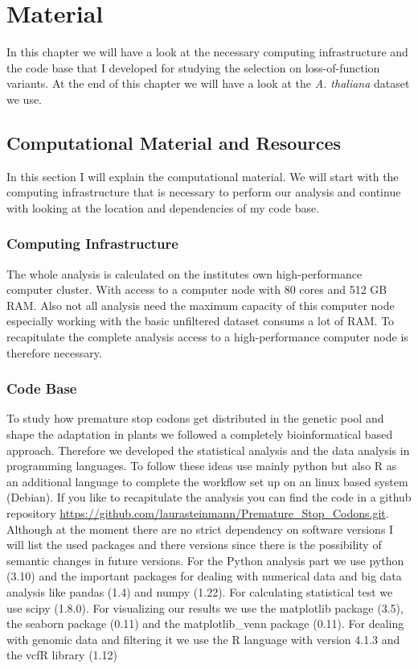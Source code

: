 \chapter{Material}
In this chapter we will have a look at the necessary computing infrastructure and the code base that I developed for studying the selection on loss-of-function variants. At the end of this chapter we will have a look at the \textit{A. thaliana} dataset we use.
\section{Computational Material and Resources}
In this section I will explain the computational material. We will start with the computing infrastructure that is necessary to perform our analysis and continue with looking at the location and dependencies of my code base.
\subsection{Computing Infrastructure}
The whole analysis is calculated on the institutes own high-performance computer cluster. With access to a computer node with 80 cores and 512 GB RAM. Also not all analysis need the maximum capacity of this computer node especially working with the basic unfiltered dataset consums a lot of RAM. To recapitulate the complete analysis access to a high-performance computer node is therefore necessary. 
\subsection{Code Base}
To study how premature stop codons get distributed in the genetic pool and shape the adaptation in plants we followed a completely bioinformatical based approach. Therefore we developed the statistical analysis and the data analysis in programming languages. To follow these ideas use mainly python but also R as an additional language to complete the workflow set up on an linux based system (Debian). If you like to recapitulate the analysis you can find the code in a github repository \url{https://github.com/laurasteinmann/Premature_Stop_Codons.git}.\\
Although at the moment there are no strict dependency on software versions I will list the used packages and there versions since there is the possibility of semantic changes in future versions. For the Python analysis part we use python (3.10) and the important packages for dealing with numerical data and big data analysis like pandas (1.4) and  numpy (1.22). For calculating statistical test we use scipy (1.8.0). For visualizing our results we use the matplotlib package (3.5), the seaborn package (0.11) and the matplotlib\_venn package (0.11). For dealing with genomic data and filtering it we use the R language with version 4.1.3 and the vcfR library (1.12)
